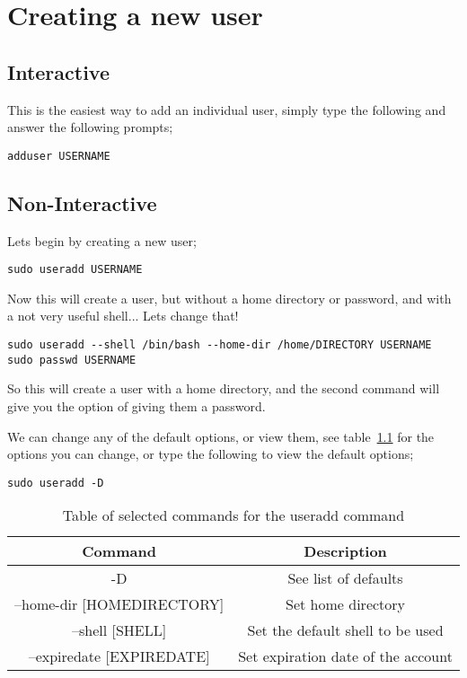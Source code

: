 \chapter{Creating a new user}


\section{Interactive}

This is the easiest way to add an individual user, simply type the following and answer the following prompts;

\begin{lstlisting}
adduser USERNAME
\end{lstlisting}

\section{Non-Interactive}

Lets begin by creating a new user;

\begin{lstlisting}
sudo useradd USERNAME
\end{lstlisting}

Now this will create a user, but without a home directory or password, and with a not very useful shell... Lets change that!

\begin{lstlisting}
sudo useradd --shell /bin/bash --home-dir /home/DIRECTORY USERNAME
sudo passwd USERNAME
\end{lstlisting}

So this will create a user with a home directory, and the second command will give you the option of giving them a password.

We can change any of the default options, or view them, see table~\ref{tab:useradd} for the options you can change, or type the following to view the default options;

\begin{lstlisting}
sudo useradd -D
\end{lstlisting}

\begin{table}[!th]
\centering
\begin{tabular}{cc}
\hline
Command & Description\\
\hline
-D & See list of defaults\\
--home-dir [HOMEDIRECTORY] & Set home directory\\
--shell [SHELL] & Set the default shell to be used\\
--expiredate [EXPIREDATE] & Set expiration date of the account\\
\hline
\end{tabular}
\caption{Table of selected commands for the useradd command}
\label{tab:useradd}
\end{table}

